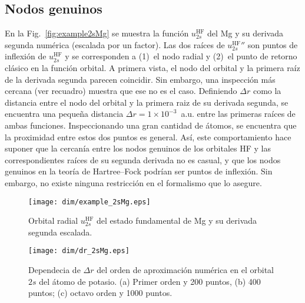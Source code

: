 \subsection{Nodos genuinos}
\label{subsec:nodosHF}

En la Fig.~\ref{fig:example2sMg} se muestra la función 
$u_{2s}^{\mathrm{HF}}$ del Mg y su derivada segunda numérica (escalada 
por un factor). Las dos raíces de $u_{2s}^{\mathrm{HF}}''$ son puntos de 
inflexión de $u_{2s}^{\mathrm{HF}}$ y se corresponden a (1)~el nodo 
radial y (2)~el punto de retorno clásico en la función orbital. A 
primera vista, el nodo del orbital y la primera raíz de la derivada 
segunda parecen coincidir. Sin embargo, una inspección más cercana (ver 
recuadro) muestra que ese no es el caso. Definiendo $\Delta r$ como la 
distancia entre el nodo del orbital y la primera raiz de su derivada 
segunda, se encuentra una pequeña distancia $\Delta r=1\times 
10^{-3}$~a.u. entre las primeras raíces de ambas funciones. 
Inspeccionando una gran cantidad de átomos, se encuentra que la 
proximidad entre estos dos puntos es general. 
Así, este comportamiento hace suponer que la cercanía entre los nodos 
genuinos de los orbitales HF y las correspondientes raíces de su segunda 
derivada no es casual, y que los nodos genuinos en la teoría de 
Hartree--Fock podrían ser puntos de inflexión. Sin embargo, no existe 
ninguna restricción en el formalismo que lo asegure.

\begin{figure}
\centering
\vspace{-0.45cm}
\texttt{[image: dim/example\_2sMg.eps]} 
\vspace{-0.45cm}
\caption[Orbital radial y su derivada segunda.]
{Orbital radial $u_{2s}^{\mathrm{HF}}$ del estado fundamental de Mg y su 
derivada segunda escalada.}
\label{fig:example2sMg}

\vspace{0.25cm}
\texttt{[image: dim/dr\_2sMg.eps]} 
\vspace{-0.45cm}
\caption[Dependecia de $\Delta r$ del orden de aproximación numérica.]
{Dependecia de $\Delta r$ del orden de aproximación numérica en el 
orbital $2s$ del átomo de potasio. (a) Primer orden y 200 puntos, (b) 
400 puntos; (c) octavo orden y 1000 puntos.}
\label{fig:dr2sMg}
\end{figure}

